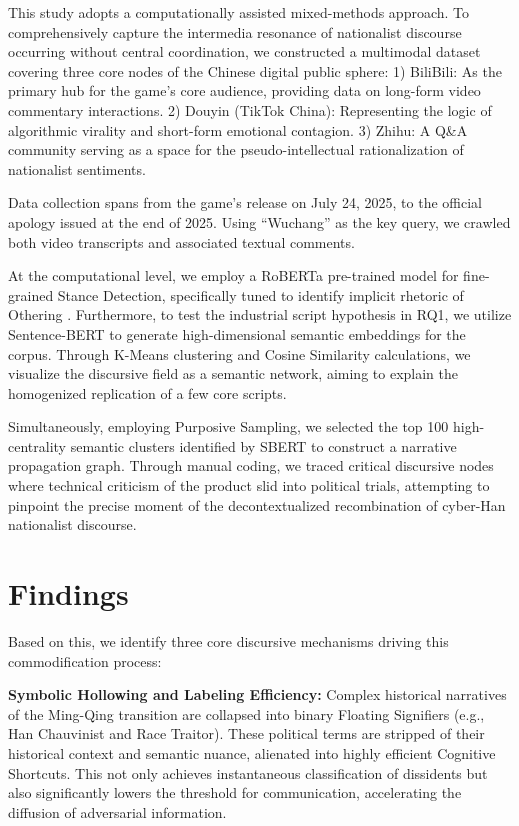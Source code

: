 \documentclass[letterpaper]{article}
\begin{document}
This study adopts a computationally assisted mixed-methods approach. To comprehensively capture the intermedia resonance of nationalist discourse occurring without central coordination, we constructed a multimodal dataset covering three core nodes of the Chinese digital public sphere: 1) BiliBili: As the primary hub for the game's core audience, providing data on long-form video commentary interactions. 2) Douyin (TikTok China): Representing the logic of algorithmic virality and short-form emotional contagion. 3) Zhihu: A Q\&A community serving as a space for the pseudo-intellectual rationalization of nationalist sentiments.

Data collection spans from the game's release on July 24, 2025, to the official apology issued at the end of 2025. Using ``Wuchang'' as the key query, we crawled both video transcripts and associated textual comments.

At the computational level, we employ a RoBERTa pre-trained model for fine-grained Stance Detection, specifically tuned to identify implicit rhetoric of Othering \citep{laclau2005}. Furthermore, to test the industrial script hypothesis in RQ1, we utilize Sentence-BERT to generate high-dimensional semantic embeddings for the corpus. Through K-Means clustering and Cosine Similarity calculations, we visualize the discursive field as a semantic network, aiming to explain the homogenized replication of a few core scripts.

Simultaneously, employing Purposive Sampling, we selected the top 100 high-centrality semantic clusters identified by SBERT to construct a narrative propagation graph. Through manual coding, we traced critical discursive nodes where technical criticism of the product slid into political trials, attempting to pinpoint the precise moment of the decontextualized recombination of cyber-Han nationalist discourse.

\section{Findings}

Based on this, we identify three core discursive mechanisms driving this commodification process:

\textbf{Symbolic Hollowing and Labeling Efficiency:} Complex historical narratives of the Ming-Qing transition are collapsed into binary Floating Signifiers (e.g., Han Chauvinist and Race Traitor). These political terms are stripped of their historical context and semantic nuance, alienated into highly efficient Cognitive Shortcuts. This not only achieves instantaneous classification of dissidents but also significantly lowers the threshold for communication, accelerating the diffusion of adversarial information.
\end{document}
